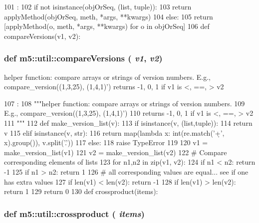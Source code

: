 \begin{DoxyCode}
101                                                :
102     if not isinstance(objOrSeq, (list, tuple)):
103         return applyMethod(objOrSeq, meth, *args, **kwargs)
104     else:
105         return [applyMethod(o, meth, *args, **kwargs) for o in objOrSeq]
106 
def compareVersions(v1, v2):
\end{DoxyCode}
\hypertarget{namespacem5_1_1util_a5b6cc0ea95b0e707231a420d9bd57f07}{
\subsubsection[{compareVersions}]{\setlength{\rightskip}{0pt plus 5cm}def m5::util::compareVersions ( {\em v1}, \/   {\em v2})}}
\label{namespacem5_1_1util_a5b6cc0ea95b0e707231a420d9bd57f07}
\begin{DoxyVerb}helper function: compare arrays or strings of version numbers.
E.g., compare_version((1,3,25), (1,4,1)')
returns -1, 0, 1 if v1 is <, ==, > v2
\end{DoxyVerb}
 


\begin{DoxyCode}
107                            :
108     """helper function: compare arrays or strings of version numbers.
109     E.g., compare_version((1,3,25), (1,4,1)')
110     returns -1, 0, 1 if v1 is <, ==, > v2
111     """
112     def make_version_list(v):
113         if isinstance(v, (list,tuple)):
114             return v
115         elif isinstance(v, str):
116             return map(lambda x: int(re.match('\d+', x).group()), v.split('.'))
117         else:
118             raise TypeError
119 
120     v1 = make_version_list(v1)
121     v2 = make_version_list(v2)
122     # Compare corresponding elements of lists
123     for n1,n2 in zip(v1, v2):
124         if n1 < n2: return -1
125         if n1 > n2: return  1
126     # all corresponding values are equal... see if one has extra values
127     if len(v1) < len(v2): return -1
128     if len(v1) > len(v2): return  1
129     return 0
130 
def crossproduct(items):
\end{DoxyCode}
\hypertarget{namespacem5_1_1util_a15681e303c0d9c6c1bc489f4197e4814}{
\subsubsection[{crossproduct}]{\setlength{\rightskip}{0pt plus 5cm}def m5::util::crossproduct ( {\em items})}}
\label{namespacem5_1_1util_a15681e303c0d9c6c1bc489f4197e4814}



